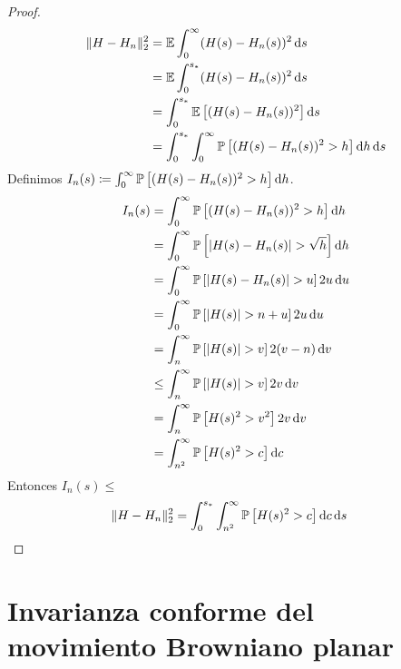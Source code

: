 \begin{proof}
  \begin{align}
    \lVert H - H_n\rVert_2^2
    &=
    \operatorname{\mathbb{E}} \int_0^{\infty} (H(s) - H_n(s))^2 \mathop{}\!\mathrm{d} s
    \\
    &=
    \operatorname{\mathbb{E}} \int_0^{s_*} (H(s) - H_n(s))^2 \mathop{}\!\mathrm{d} s
    \\
    &=
    \int_0^{s_*} \operatorname{\mathbb{E}} \left[ (H(s) - H_n(s))^2 \right] \mathop{}\!\mathrm{d} s
    \\
    &=
    \int_0^{s_*} \int_0^{\infty} \mathbb{P} \left[ (H(s) - H_n(s))^2 > h \right] \mathop{}\!\mathrm{d} h \mathop{}\!\mathrm{d} s
  \end{align}
  Definimos \(I_n(s) \coloneqq \int_0^{\infty} \mathbb{P} \left[ (H(s) - H_n(s))^2 > h \right] \mathop{}\!\mathrm{d} h\).
  \begin{align}
    I_n(s)
    &=
    \int_0^{\infty} \prob \left[ (H(s) - H_n(s))^2 > h \right] \dd h
    \\
    &=
    \int_0^{\infty} \prob \left[ \abs{H(s) - H_n(s)} > \sqrt{h} \right] \dd h
    \\
    &=
    \int_0^{\infty} \prob \left[ \abs{H(s) - H_n(s)} > u \right] 2 u \dd u
    \\
    &=
    \int_0^{\infty} \prob \left[ \abs{H(s)} > n + u \right] 2 u \dd u
    \\
    &=
    \int_n^{\infty} \prob \left[ \abs{H(s)} > v \right] 2 (v - n) \dd v
    \\
    &\leq
    \int_n^{\infty} \prob \left[ \abs{H(s)} > v \right] 2 v \dd v
    \\
    &=
    \int_n^{\infty} \prob \left[ H(s)^2 > v^2 \right] 2 v \dd v
    \\
    &=
    \int_{n^2}^{\infty} \prob \left[ H(s)^2 > c \right] \dd c
  \end{align}
  Entonces \(I_n(s) \leq \)
  \begin{align}
    \lVert H - H_n\rVert_2^2
    &=
    \int_0^{s_*} 
      \int_{n^2}^{\infty} 
        \mathbb{P} \left[ H(s)^2 > c \right] 
      \mathop{}\!\mathrm{d} c 
    \mathop{}\!\mathrm{d} s
  \end{align}
  
\end{proof}


\part{Invarianza conforme del movimiento Browniano planar}

